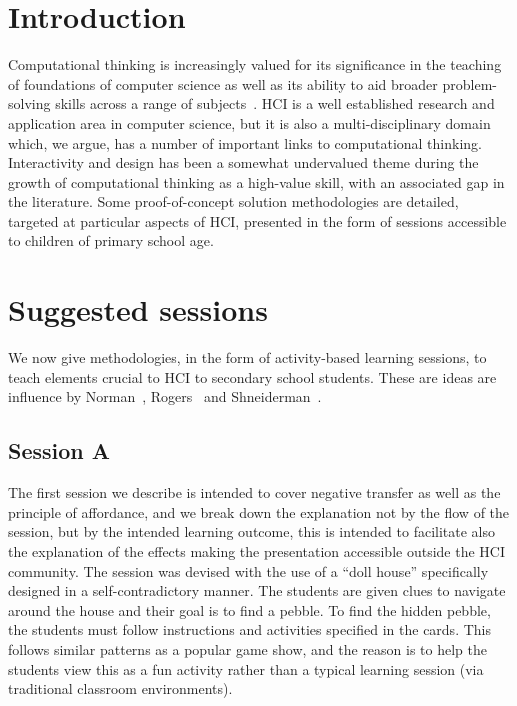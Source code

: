 \documentclass{sig-alternate}
\begin{document}
\section{Introduction}

Computational thinking is increasingly valued for its significance in
the teaching of foundations of computer science as well as its ability
to aid broader problem-solving skills across a range of
subjects~\cite{brown-et-al-sigcse2012,brown-et-al-toce2014}. HCI is a
well established research and application area in computer science,
but it is also a multi-disciplinary domain which, we argue, has a
number of important links to computational thinking. Interactivity and
design has been a somewhat undervalued theme during the growth of
computational thinking as a high-value skill, with an associated gap
in the literature. Some proof-of-concept solution methodologies are
detailed, targeted at particular aspects of HCI, presented in the form
of sessions accessible to children of primary school age.

\section{Suggested sessions}

We now give methodologies, in the form of activity-based learning
sessions, to teach elements crucial to HCI to secondary school
students. These are ideas are influence by
Norman~\cite{norman2002design}, Rogers~\cite{rogers2011interaction}
and Shneiderman~\cite{shneiderman1986designing}.

\subsection{Session A}

The first session we describe is intended to cover negative transfer
as well as the principle of affordance, and we break down the
explanation not by the flow of the session, but by the intended
learning outcome, this is intended to facilitate also the explanation
of the effects making the presentation accessible outside the HCI
community. The session was devised with the use of a ``doll house''
specifically designed in a self-contradictory manner. The students are
given clues to navigate around the house and their goal is to find a
pebble. To find the hidden pebble, the students must follow
instructions and activities specified in the cards. This follows
similar patterns as a popular game show, and the reason is to help the
students view this as a fun activity rather than a typical learning
session (via traditional classroom environments).
\end{document}
